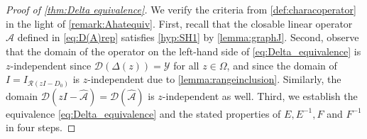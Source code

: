 \documentclass[english]{myarticle}
\begin{document}
\begin{sloppypar}
\begin{proof}[Proof of \cref{thm:Delta equivalence}]
We verify the criteria from \cref{def:characoperator} in the light of \cref{remark:Ahatequiv}. First, recall that the closable linear operator $\hat{\mathcal{A}}$ defined in \eqref{eq:D(A)rep} satisfies \ref{hyp:SH1} by \cref{lemma:graphJ}. Second, observe that the domain of the operator on the left-hand side of \eqref{eq:Delta_equivalence} is $z$-independent since $\mathcal{D}(\Delta(z)) = \mathcal{Y}$ for all $z \in \Omega$, and since the domain of $I = I_{\mathcal{R}(zI-D_0)}$ is $z$-independent due to \cref{lemma:rangeinclusion}. Similarly, the domain $\mathcal{D}(zI - \hat{\mathcal{A}}) = \mathcal{D}(\hat{\mathcal{A}})$ is $z$-independent as well. Third, we establish the equivalence \eqref{eq:Delta_equivalence} and the stated properties of $E, E^{-1}, F$ and $ F^{-1}$ in four steps.


\end{proof}
\end{sloppypar}
\end{document}
